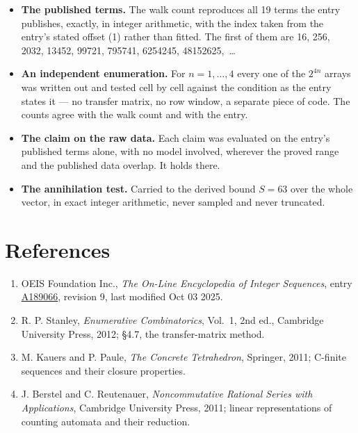 \documentclass[11pt]{article}
\theoremstyle{definition}
\begin{document}
\begin{itemize}

\item {\bfseries The published terms.} The walk count reproduces all 19 terms the entry publishes, exactly, in integer arithmetic, with the index taken from the entry's stated offset (1) rather than fitted. The first of them are 16, 256, 2032, 13452, 99721, 795741, 6254245, 48152625,~\dots

\item {\bfseries An independent enumeration.} For $n = 1,\dots,4$ every one of the $2^{4n}$ arrays was written out and tested cell by cell against the condition as the entry states it --- no transfer matrix, no row window, a separate piece of code. The counts agree with the walk count and with the entry.

\item {\bfseries The claim on the raw data.} Each claim was evaluated on the entry's published terms alone, with no model involved, wherever the proved range and the published data overlap. It holds there.

\item {\bfseries The annihilation test.} Carried to the derived bound $S = 63$ over the whole vector, in exact integer arithmetic, never sampled and never truncated.

\end{itemize}

\section{References}

\begin{enumerate}

\item OEIS Foundation Inc., \emph{The On-Line Encyclopedia of Integer Sequences}, entry \href{https://oeis.org/A189066}{A189066}, revision 9, last modified Oct 03 2025.

\item R. P. Stanley, \emph{Enumerative Combinatorics}, Vol.~1, 2nd ed., Cambridge University Press, 2012; \S4.7, the transfer-matrix method.

\item M. Kauers and P. Paule, \emph{The Concrete Tetrahedron}, Springer, 2011; C-finite sequences and their closure properties.

\item J. Berstel and C. Reutenauer, \emph{Noncommutative Rational Series with Applications}, Cambridge University Press, 2011; linear representations of counting automata and their reduction.

\end{enumerate}
\end{document}
